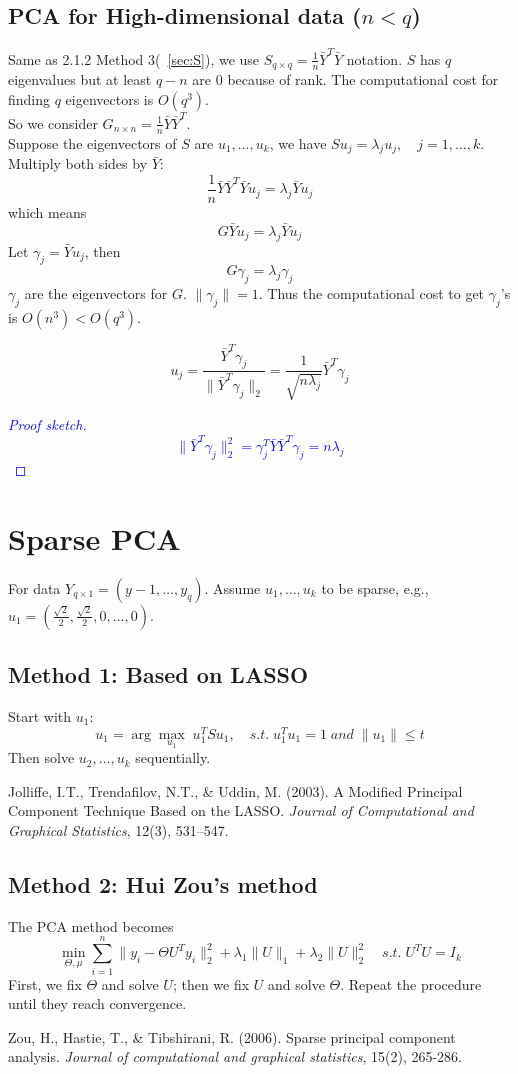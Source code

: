 \documentclass[12pt]{book}
\theoremstyle{definition}
\theoremstyle{remark}
\begin{document}
\subsection{PCA for High-dimensional data ($n<q$)}
Same as 2.1.2 Method 3(~\ref{sec:S}), we use $S_{q\times q} = \frac{1}{n}\bar{Y}^T\bar{Y}$ notation. $S$ has $q$ eigenvalues but at least $q-n$ are 0 because of rank. The computational cost for finding $q$ eigenvectors is $O(q^3)$.\\
So we consider $G_{n\times n} = \frac{1}{n}\bar{Y}\bar{Y}^T$.\\
Suppose the eigenvectors of $S$ are $u_1, \dots, u_k$, we have $Su_j = \lambda_j u_j,\quad j = 1,\dots, k$.\\
Multiply both sides by $\bar{Y}$:
\[\frac{1}{n}\bar{Y}\bar{Y}^T\bar{Y}u_j = \lambda_j\bar{Y}u_j\]
which means 
\[G\bar{Y}u_j = \lambda_j\bar{Y}u_j\]
Let $\gamma_j = \bar{Y}u_j$, then 
\[G\gamma_j = \lambda_j\gamma_j\]
$\gamma_j$ are the eigenvectors for $G$. $\|\gamma_j\| = 1$. Thus the computational cost to get $\gamma_j$'s is $O(n^3)<O(q^3)$.

\[u_j = \frac{\bar{Y}^T\gamma_j}{\|\bar{Y}^T\gamma_j\|_2} = \frac{1}{\sqrt{n\lambda_j}}\bar{Y}^T\gamma_j\]
\textcolor{blue}{
\begin{proof}[Proof sketch]
    \[\|\bar{Y}^T\gamma_j\|_2^2 = \gamma_j^T\bar{Y}\bar{Y}^T\gamma_j = n\lambda_j\]
\end{proof}
}

\newpage
\section{Sparse PCA}
For data $Y_{q\times 1} = (y-1, \dots, y_q)$. Assume $u_1, \dots, u_k$ to be sparse, e.g., $u_1 = (\frac{\sqrt{2}}{2},\frac{\sqrt{2}}{2},0,\dots, 0)$.
\subsection{Method 1: Based on LASSO}
Start with $u_1$:
\[u_1 = \arg\underset{u_1}{\max}\; u_1^TSu_1, \quad s.t. \;u_1^Tu_1 = 1 \; and \; \|u_1\|\le t\]
Then solve $u_2,\dots, u_k$ sequentially.
\begin{referencebox}
    Jolliffe, I.T., Trendafilov, N.T., \& Uddin, M. (2003). A Modified Principal Component Technique Based on the LASSO. \textit{Journal of Computational and Graphical Statistics}, 12(3), 531–547.
\end{referencebox}

\subsection{Method 2: Hui Zou's method}
The PCA method becomes
\[\underset{\Theta, \mu}{\min}\sum_{i=1}^n\|y_i - \Theta U^Ty_i\|_2^2+\lambda_1\|U\|_1+\lambda_2\|U\|_2^2 \quad s.t. \;U^TU = I_k\]
First, we fix $\Theta$ and solve $U$; then we fix $U$ and solve $\Theta$. Repeat the procedure until they reach convergence.
\begin{referencebox}
    Zou, H., Hastie, T., \& Tibshirani, R. (2006). Sparse principal component analysis. \textit{Journal of computational and graphical statistics}, 15(2), 265-286.
\end{referencebox}
\end{document}
